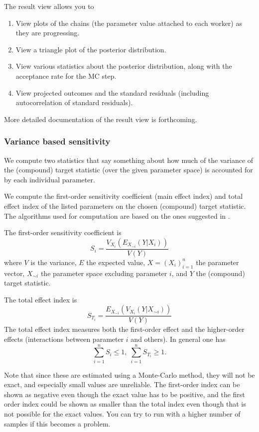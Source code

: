 \documentclass[11pt]{article}
\theoremstyle{definition}
\begin{document}
The result view allows you to
\begin{enumerate}
\item View plots of the chains (the parameter value attached to each worker) as they are progressing.
\item View a triangle plot of the posterior distribution.
\item View various statistics about the posterior distribution, along with the acceptance rate for the MC step.
\item View projected outcomes and the standard residuals (including autocorrelation of standard residuals).
\end{enumerate}
More detailed documentation of the result view is forthcoming.

\subsubsection{Variance based sensitivity}
We compute two statistics that say something about how much of the variance of the (compound) target statistic (over the given parameter space) is accounted for by each individual parameter.

We compute the first-order sensitivity coefficient (main effect index) and total effect index of the listed parameters on the chosen (compound) target statistic. The algorithms used for computation are based on the ones suggested in \cite{saltelli-et-al10}.

The first-order sensitivity coefficient is
\[
S_i = \frac{V_{X_i}(E_{X_{\sim i}}(Y|X_i))}{V(Y)}
\]
where $V$ is the variance, $E$ the expected value, $X=(X_i)_{i=1}^n$ the parameter vector, $X_{\sim i}$ the parameter space excluding parameter $i$, and $Y$ the (compound) target statistic.

The total effect index is
\[
S_{T_i} = \frac{E_{X_{\sim i}}(V_{X_i}(Y|X_{\sim i}))}{V(Y)}
\]
The total effect index measures both the first-order effect and the higher-order effects (interactions between parameter $i$ and others). In general one has
\[
\sum_{i=1}^n S_i \leq 1,\; \sum_{i=1}^n S_{T_i} \geq 1.
\]

Note that since these are estimated using a Monte-Carlo method, they will not be exact, and especially small values are unreliable. The first-order index can be shown as negative even though the exact value has to be positive, and the first order index could be shown as smaller than the total index even though that is not possible for the exact values. You can try to run with a higher number of samples if this becomes a problem.
\end{document}
